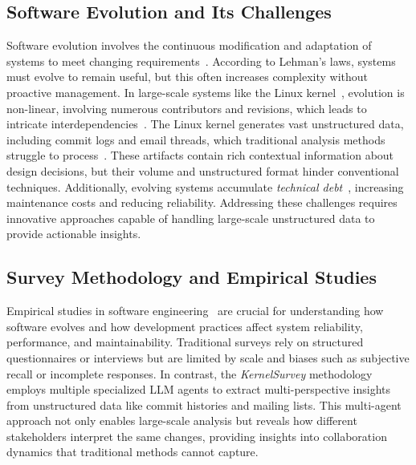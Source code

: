 \documentclass[sigconf,review,anonymous]{acmart}
\newcommand{\sys}{\textit{KernelSurvey}\xspace}
\begin{document}
\subsection{Software Evolution and Its Challenges}
Software evolution involves the continuous modification and adaptation of systems to meet changing requirements~\cite{lehman1996laws}. According to Lehman's laws, systems must evolve to remain useful, but this often increases complexity without proactive management. In large-scale systems like the Linux kernel~\cite{linux}, evolution is non-linear, involving numerous contributors and revisions, which leads to intricate interdependencies~\cite{israeli2010linux}. The Linux kernel generates vast unstructured data, including commit logs and email threads, which traditional analysis methods struggle to process~\cite{mens2008introduction}. These artifacts contain rich contextual information about design decisions, but their volume and unstructured format hinder conventional techniques. Additionally, evolving systems accumulate \emph{technical debt}~\cite{brown2010managing}, increasing maintenance costs and reducing reliability. Addressing these challenges requires innovative approaches capable of handling large-scale unstructured data to provide actionable insights.



\subsection{Survey Methodology and Empirical Studies}

Empirical studies in software engineering~\cite{perry2000empirical} are crucial for understanding how software evolves and how development practices affect system reliability, performance, and maintainability. Traditional surveys rely on structured questionnaires or interviews but are limited by scale and biases such as subjective recall or incomplete responses. In contrast, the \sys methodology employs multiple specialized LLM agents to extract multi-perspective insights from unstructured data like commit histories and mailing lists. This multi-agent approach not only enables large-scale analysis but reveals how different stakeholders interpret the same changes, providing insights into collaboration dynamics that traditional methods cannot capture.
\end{document}
